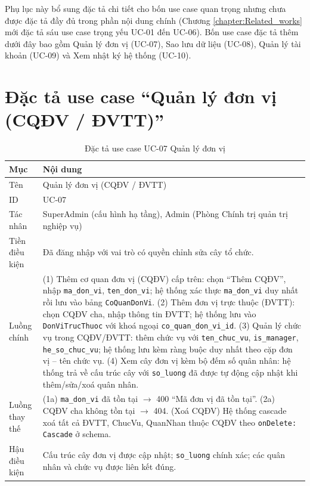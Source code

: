 \documentclass[../DoAn.tex]{subfiles}
\begin{document}
Phụ lục này bổ sung đặc tả chi tiết cho bốn use case quan trọng nhưng chưa được đặc tả đầy đủ trong phần nội dung chính (Chương \ref{chapter:Related_works} mới đặc tả sáu use case trọng yếu UC-01 đến UC-06). Bốn use case đặc tả thêm dưới đây bao gồm Quản lý đơn vị (UC-07), Sao lưu dữ liệu (UC-08), Quản lý tài khoản (UC-09) và Xem nhật ký hệ thống (UC-10).

\section{Đặc tả use case ``Quản lý đơn vị (CQĐV / ĐVTT)''}
\label{appendix:uc07}

\begin{table}[H]
\centering
\caption{Đặc tả use case UC-07 Quản lý đơn vị}
\label{tab:uc07}
\begin{tabular}{|>{\raggedright\arraybackslash}p{3cm}|p{11cm}|}
\hline
\textbf{Mục} & \textbf{Nội dung} \\ \hline
Tên & Quản lý đơn vị (CQĐV / ĐVTT) \\ \hline
ID & UC-07 \\ \hline
Tác nhân & SuperAdmin (cấu hình hạ tầng), Admin (Phòng Chính trị quản trị nghiệp vụ) \\ \hline
Tiền điều kiện & Đã đăng nhập với vai trò có quyền chỉnh sửa cây tổ chức. \\ \hline
Luồng chính &
(1) Thêm cơ quan đơn vị (CQĐV) cấp trên: chọn ``Thêm CQĐV'', nhập \texttt{ma\_don\_vi}, \texttt{ten\_don\_vi}; hệ thống xác thực \texttt{ma\_don\_vi} duy nhất rồi lưu vào bảng \texttt{CoQuanDonVi}. (2) Thêm đơn vị trực thuộc (ĐVTT): chọn CQĐV cha, nhập thông tin ĐVTT; hệ thống lưu vào \texttt{DonViTrucThuoc} với khoá ngoại \texttt{co\_quan\_don\_vi\_id}. (3) Quản lý chức vụ trong CQĐV/ĐVTT: thêm chức vụ với \texttt{ten\_chuc\_vu}, \texttt{is\_manager}, \texttt{he\_so\_chuc\_vu}; hệ thống lưu kèm ràng buộc duy nhất theo cặp đơn vị -- tên chức vụ. (4) Xem cây đơn vị kèm bộ đếm số quân nhân: hệ thống trả về cấu trúc cây với \texttt{so\_luong} đã được tự động cập nhật khi thêm/sửa/xoá quân nhân. \\ \hline
Luồng thay thế &
(1a) \texttt{ma\_don\_vi} đã tồn tại $\rightarrow$ 400 ``Mã đơn vị đã tồn tại''. (2a) CQĐV cha không tồn tại $\rightarrow$ 404. (Xoá CQĐV) Hệ thống cascade xoá tất cả ĐVTT, ChucVu, QuanNhan thuộc CQĐV theo \texttt{onDelete: Cascade} ở schema. \\ \hline
Hậu điều kiện & Cấu trúc cây đơn vị được cập nhật; \texttt{so\_luong} chính xác; các quân nhân và chức vụ được liên kết đúng. \\ \hline
\end{tabular}
\end{table}
\end{document}
